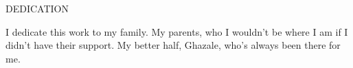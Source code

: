 \newpage
{}

\begin{center}
DEDICATION
\end{center}

\begin{center}
I dedicate this work to my family. My parents, who I wouldn't be where I am if I didn't have their support. My better half, Ghazale, who's always been there for me.
\end{center}
